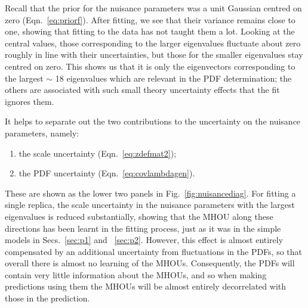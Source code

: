 Recall that the prior for the nuisance parameters was a unit Gaussian centred on zero (Eqn.~\ref{eq:priorf}). After fitting, we see that their variance remains close to one, showing that fitting to the data has not taught them a lot. Looking at the central values, those corresponding to the larger eigenvalues fluctuate about zero roughly in line with their uncertainties, but those for the smaller eigenvalues stay centred on zero. This shows us that it is only the eigenvectors corresponding to the largest $\sim$ 18 eigenvalues which are relevant in the PDF determination; the others are associated with such small theory uncertainty effects that the fit ignores them.

It helps to separate out the two contributions to the uncertainty on the nuisance parameters, namely:
\begin{enumerate}
\item the scale uncertainty (Eqn.~\ref{eq:zdefmat2});
\item the PDF uncertainty (Eqn.~\ref{eq:covlambdagen}).
\end{enumerate}
These are shown as the lower two panels in Fig.~\ref{fig:nuisancediag}. For fitting a single replica, the scale uncertainty in the nuisance parameters with the largest eigenvalues is reduced substantially, showing that the MHOU along these directions has been learnt in the fitting process, just as it was in the simple models in Secs.~\ref{sec:p1} and ~\ref{sec:p2}. However, this effect is almost entirely compensated by an additional uncertainty from fluctuations in the PDFs, so that overall there is almost no learning of the MHOUs. Consequently, the PDFs will contain very little information about the MHOUs, and so when making predictions using them the MHOUs will be almost entirely decorrelated with those in the prediction.
